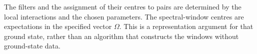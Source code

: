 The filters and the assignment of their centres to pairs are determined
by the local interactions and the chosen parameters. The spectral-window
centres are expectations in the specified vector $\Omega$. This is a
representation argument for that ground state, rather than an algorithm
that constructs the windows without ground-state data.
